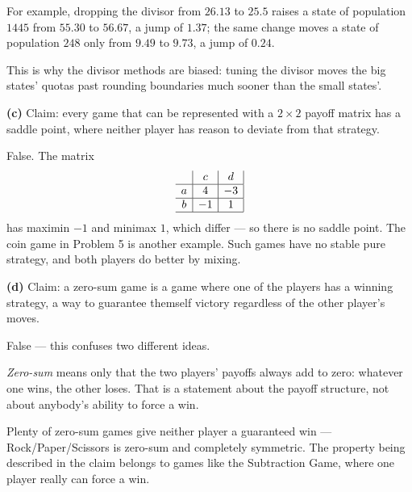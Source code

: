 \documentclass[12pt]{ximera}
\begin{document}
\begin{problem}
\begin{prompt}
\begin{feedback}
For example, dropping the divisor from $26.13$ to $25.5$ raises a state of population
$1445$ from $55.30$ to $56.67$, a jump of $1.37$; the same change moves a state of
population $248$ only from $9.49$ to $9.73$, a jump of $0.24$.

This is why the divisor methods are biased: tuning the divisor moves the big states'
quotas past rounding boundaries much sooner than the small states'.
\end{feedback}
\end{prompt}

\begin{prompt}
\textbf{(c)} Claim: every game that can be represented with a $2\times 2$ payoff matrix
has a saddle point, where neither player has reason to deviate from that strategy.

\begin{multipleChoice}
\end{multipleChoice}

\begin{feedback}
False. The matrix
\[
\begin{array}{c|c|c|}
\phantom{|} & c & d \\\hline
a & 4 & -3 \\\hline
b & -1 & 1 \\\hline
\end{array}
\]
has maximin $-1$ and minimax $1$, which differ --- so there is no saddle point. The coin
game in Problem 5 is another example. Such games have no stable pure strategy, and both
players do better by mixing.
\end{feedback}
\end{prompt}

\begin{prompt}
\textbf{(d)} Claim: a zero-sum game is a game where one of the players has a winning
strategy, a way to guarantee themself victory regardless of the other player's moves.

\begin{multipleChoice}
\end{multipleChoice}

\begin{feedback}
False --- this confuses two different ideas.

\emph{Zero-sum} means only that the two players' payoffs always add to zero: whatever
one wins, the other loses. That is a statement about the payoff structure, not about
anybody's ability to force a win.

Plenty of zero-sum games give neither player a guaranteed win --- Rock/Paper/Scissors is
zero-sum and completely symmetric. The property being described in the claim belongs to
games like the Subtraction Game, where one player really can force a win.
\end{feedback}
\end{prompt}
\end{problem}
\end{document}
